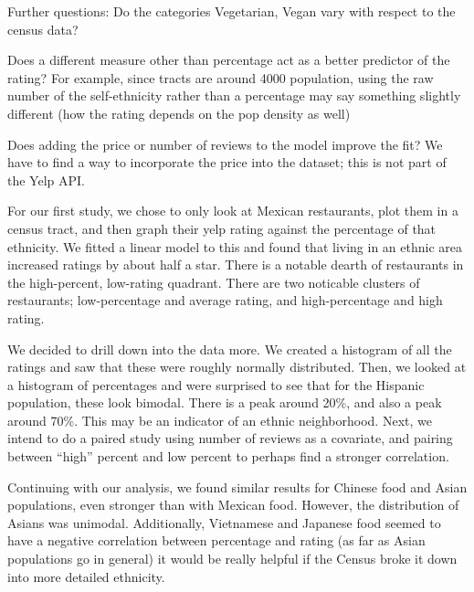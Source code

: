 \documentclass[12pt,letterpaper]{report}
\begin{document}
Further questions:
Do the categories Vegetarian, Vegan vary with respect to the census data?

Does a different measure other than percentage act as a better predictor of the rating? For example, since tracts are around 4000 population, using the raw number of the self-ethnicity rather than a percentage may say something slightly different (how the rating depends on the pop density as well)

Does adding the price or number of reviews to the model improve the fit? We have to find a way to incorporate the price into the dataset; this is not part of the Yelp API.

For our first study, we chose to only look at Mexican restaurants, plot them in a census tract, and then graph their yelp rating against the percentage of that ethnicity. We fitted a linear model to this and found that living in an ethnic area increased ratings by about half a star. There is a notable dearth of restaurants in the high-percent, low-rating quadrant. There are two noticable clusters of restaurants; low-percentage and average rating, and high-percentage and high rating.

We decided to drill down into the data more. We created a histogram of all the ratings and saw that these were roughly normally distributed. Then, we looked at a histogram of percentages and were surprised to see that for the Hispanic population, these look bimodal. There is a peak around 20\%, and also a peak around 70\%. This may be an indicator of an ethnic neighborhood. Next, we intend to do a paired study using number of reviews as a covariate, and pairing between “high” percent and low percent to perhaps find a stronger correlation.

Continuing with our analysis, we found similar results for Chinese food and Asian populations, even stronger than with Mexican food. However, the distribution of Asians was unimodal. Additionally, Vietnamese and Japanese food seemed to have a negative correlation between percentage and rating (as far as Asian populations go in general) it would be really helpful if the Census broke it down into more detailed ethnicity.
\end{document}
